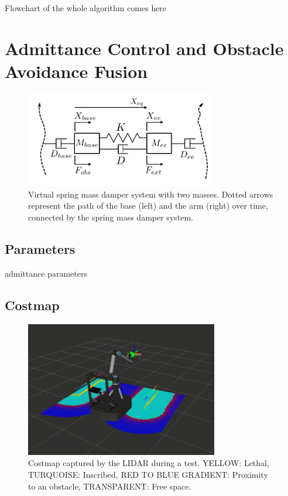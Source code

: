 Flowchart of the whole algorithm comes here
\section{Admittance Control and Obstacle Avoidance Fusion}
\begin{figure}
   \centering
   \includegraphics[width=0.75\textwidth]{images/admittance_model.jpg}
   \caption{Virtual spring mass damper system with two masses. Dotted arrows represent the path of the base (left) and the arm (right) over time, connected by the spring mass damper system.}
   \label{pics:admittance_model}
\end{figure}


\subsection{Parameters}
admittance parameters
\subsection{Costmap}
\begin{figure}
   \centering
   \includegraphics[width=0.75\textwidth]{images/costmap.png}
   \caption{Costmap captured by the LIDAR during a test. YELLOW: Lethal, TURQUOISE: Inscribed, RED TO BLUE GRADIENT: Proximity to an obstacle, TRANSPARENT: Free space. }
   \label{pics:costmap}
\end{figure}

